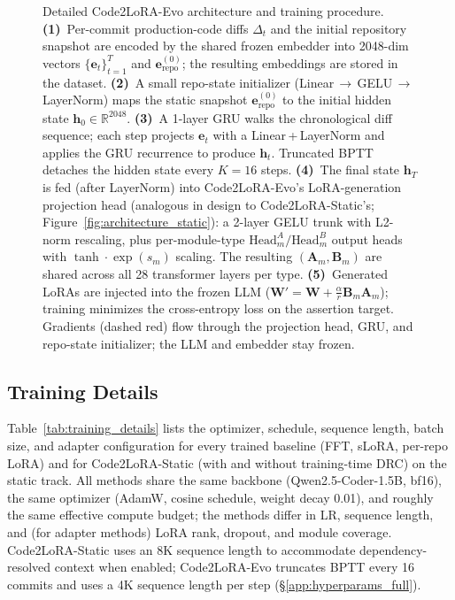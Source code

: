 \documentclass{llmxive}
\providecommand{\codelora}{Code2LoRA\xspace}
\providecommand{\codelorastatic}{\codelora-Static\xspace}
\providecommand{\codeloraevo}{\codelora-Evo\xspace}
\begin{document}
\begin{figure}[t]
\begin{center}
\caption{Detailed \codeloraevo{} architecture and training procedure.
\textbf{(1)}~Per-commit production-code diffs $\Delta_t$ and the initial repository snapshot are encoded by the shared frozen embedder into 2048-dim vectors $\{\mathbf{e}_t\}_{t=1}^T$ and $\mathbf{e}_{\text{repo}}^{(0)}$; the resulting embeddings are stored in the dataset.
\textbf{(2)}~A small repo-state initializer (Linear\,$\to$\,GELU\,$\to$\,LayerNorm) maps the static snapshot $\mathbf{e}_{\text{repo}}^{(0)}$ to the initial hidden state $\mathbf{h}_0\!\in\!\mathbb{R}^{2048}$.
\textbf{(3)}~A 1-layer GRU walks the chronological diff sequence; each step projects $\mathbf{e}_t$ with a Linear\,+\,LayerNorm and applies the GRU recurrence to produce $\mathbf{h}_t$. Truncated BPTT detaches the hidden state every $K{=}16$ steps.
\textbf{(4)}~The final state $\mathbf{h}_T$ is fed (after LayerNorm) into \codeloraevo{}'s LoRA-generation projection head (analogous in design to \codelorastatic{}'s; Figure~\ref{fig:architecture_static}): a 2-layer GELU trunk with L2-norm rescaling, plus per-module-type $\text{Head}^A_m / \text{Head}^B_m$ output heads with $\tanh\cdot\exp(s_m)$ scaling. The resulting $(\mathbf{A}_m, \mathbf{B}_m)$ are shared across all 28 transformer layers per type.
\textbf{(5)}~Generated LoRAs are injected into the frozen LLM ($\mathbf{W}' = \mathbf{W} + \tfrac{\alpha}{r}\mathbf{B}_m\mathbf{A}_m$); training minimizes the cross-entropy loss on the assertion target. Gradients (dashed red) flow through the projection head, GRU, and repo-state initializer; the LLM and embedder stay frozen.}
\label{fig:architecture_evo}
\end{center}
\end{figure}

\subsection{Training Details}
\label{app:training_details}

Table~\ref{tab:training_details} lists the optimizer, schedule, sequence length, batch size, and adapter configuration for every trained baseline (FFT, sLoRA, per-repo LoRA) and for \codelorastatic{} (with and without training-time DRC) on the static track.
All methods share the same backbone (Qwen2.5-Coder-1.5B, bf16), the same optimizer (AdamW, cosine schedule, weight decay 0.01), and roughly the same effective compute budget; the methods differ in LR, sequence length, and (for adapter methods) LoRA rank, dropout, and module coverage.
\codelorastatic{} uses an 8K sequence length to accommodate dependency-resolved context when enabled; \codeloraevo{} truncates BPTT every 16 commits and uses a 4K sequence length per step (\S\ref{app:hyperparams_full}).
\end{document}
